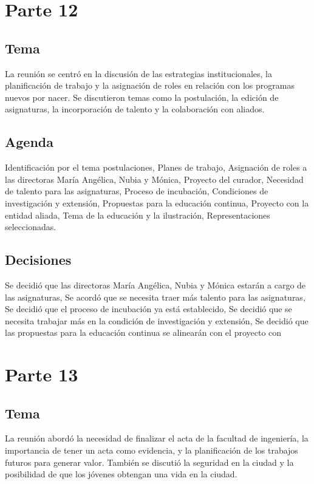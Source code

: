\documentclass{article}
\begin{document}
\section{Parte 12}
\subsection{Tema}
La reunión se centró en la discusión de las estrategias institucionales, la planificación de trabajo y la asignación de roles en relación con los programas nuevos por nacer. Se discutieron temas como la postulación, la edición de asignaturas, la incorporación de talento y la colaboración con aliados.

\subsection{Agenda}
Identificación por el tema postulaciones, Planes de trabajo, Asignación de roles a las directoras María Angélica, Nubia y Mónica, Proyecto del curador, Necesidad de talento para las asignaturas, Proceso de incubación, Condiciones de investigación y extensión, Propuestas para la educación continua, Proyecto con la entidad aliada, Tema de la educación y la ilustración, Representaciones seleccionadas.

\subsection{Decisiones}
Se decidió que las directoras María Angélica, Nubia y Mónica estarán a cargo de las asignaturas, Se acordó que se necesita traer más talento para las asignaturas, Se decidió que el proceso de incubación ya está establecido, Se decidió que se necesita trabajar más en la condición de investigación y extensión, Se decidió que las propuestas para la educación continua se alinearán con el proyecto con
\section{Parte 13}
\subsection{Tema}
La reunión abordó la necesidad de finalizar el acta de la facultad de ingeniería, la importancia de tener un acta como evidencia, y la planificación de los trabajos futuros para generar valor. También se discutió la seguridad en la ciudad y la posibilidad de que los jóvenes obtengan una vida en la ciudad.
\end{document}

